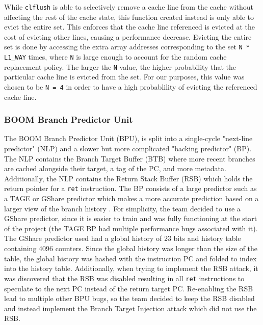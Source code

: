While {\tt clflush} is able to selectively remove a cache line from the cache without 
affecting the rest of the cache state, this function created instead is only able to evict the entire set.
This enforces that the cache line referenced is evicted at the cost of evicting other lines, causing a performance
decrease. Evicting the entire set is done by accessing the extra array addresses corresponding to the set 
{\tt N * L1\_WAY} times, where {\tt N} is large enough to account for the random cache replacement policy. The larger
the {\tt N} value, the higher probability that the particular cache line is evicted from the set. For our purposes, this value
was chosen to be {\tt N = 4} in order to have a high probablility of evicting the referenced cache line.

\subsubsection{BOOM Branch Predictor Unit}


The BOOM Branch Predictor Unit (BPU), is split into a single-cycle "next-line predictor" (NLP) and a
slower but more complicated "backing predictor" (BP). The NLP contains the Branch Target Buffer (BTB) 
where more recent branches are cached alongside their target, a tag of the PC, and more metadata. Additionally,
the NLP contains the Return Stack Buffer (RSB) which holds the return pointer for a {\tt ret} instruction. The BP
consists of a large predictor such as a TAGE or GShare predictor which makes a more accurate prediction based on
a larger view of the branch history \cite{b47}. For simplicity, the team decided to use a GShare predictor, since it is 
easier to train and was fully functioning at the start of the project (the TAGE BP had multiple performance bugs
associated with it). The GShare predictor used had a global history of 23 bits and history table containing
4096 counters. Since the global history was longer than the size of the table, the global history was hashed with
the instruction PC and folded to index into the history table. Additionally, when trying to
implement the RSB attack, it was discovered that the RSB was disabled resulting in all {\tt ret} instructions
to speculate to the next PC instead of the return target PC. Re-enabling the RSB lead to multiple other BPU bugs,
so the team decided to keep the RSB disabled and instead implement the Branch Target Injection attack which did not
use the RSB.

